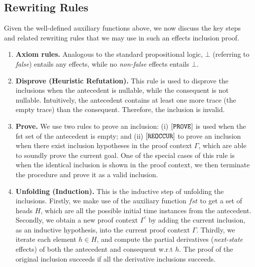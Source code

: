 \documentclass[acmsmall,10pt,review]{acmart}
\newcommand{\code}[1]{{\tt{\ensuremath{\m{#1}}}}}
\newcommand{\codeme}[1]{{\tt{\ensuremath{#1}}}}
\newcommand{\m}{\mathit}
\begin{document}
{  \vspace{2mm}
\subsection{Rewriting Rules}
\label{InferenceRules}
Given the well-defined auxiliary functions above, we now discuss the key steps and related rewriting rules that we may use in such an effects inclusion proof.  


\begin{enumerate}
\item 
\textbf{Axiom rules.}
\label{Base}
Analogous to  the standard propositional logic, \code{\bot } (referring to \textit{false}) entails any effects, while no \textit{non-false} effects entails \code{\bot }.


\item 
\textbf{Disprove (Heuristic Refutation).}
\label{Refutation}
This rule is used to disprove the inclusions when the antecedent is nullable, while the consequent is not nullable. Intuitively, the antecedent contains at least one more trace (the empty trace) than the consequent. Therefore, the inclusion is invalid. 


\item 
\textbf{Prove.}
\label{Prove}
We use two rules to prove an inclusion: (i) $\codeme{[PROVE]}$ is 
used when the fst set of the antecedent is empty; and 
(ii) $\codeme{[REOCCUR]}$ to prove an inclusion
when there exist inclusion hypotheses 
in the proof context $\m{\Gamma}$, which are able to 
soundly prove the current goal. One of the special cases of 
this rule is when the identical inclusion is shown in the proof 
context, we then terminate the procedure and prove it as a valid 
inclusion. 


\item 
\textbf{Unfolding (Induction).}
\label{unfolding}
This is the inductive step of unfolding the inclusions. Firstly, 
we make use of the auxiliary function \code{fst} to get a set of 
heads \code{H}, which are all the possible initial time instances 
from the antecedent. 
Secondly, we obtain a new proof context \code{\Gamma^\prime} by 
adding the current inclusion, as an inductive hypothesis, into 
the current proof context \code{\Gamma}. 
Thirdly, we iterate each element \code{h \in H}, and compute the 
partial derivatives (\emph{next-state} effects) of both the 
antecedent and consequent w.r.t \code{h}. The proof 
of the original inclusion succeeds if all the derivative 
inclusions succeeds.




\end{enumerate}}
\end{document}
